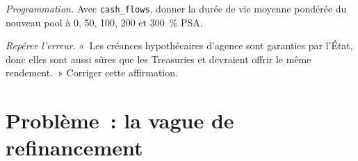 \begin{exercise}[$\star\star\star$]\label{exo:m2:mortgages-and-agencies:7}
\emph{Programmation.} Avec \texttt{cash\_flows}, donner la durée de vie moyenne pondérée du
nouveau pool à 0, 50, 100, 200 et 300~\% PSA.
\end{exercise}

\begin{exercise}[$\star\star\star$]\label{exo:m2:mortgages-and-agencies:8}
\emph{Repérer l'erreur.} «~Les créances hypothécaires d'agence sont garanties par l'État,
donc elles sont aussi sûres que les Treasuries et devraient offrir le même rendement.~» Corriger cette affirmation.
\end{exercise}

\section{Problème~: la vague de refinancement}

